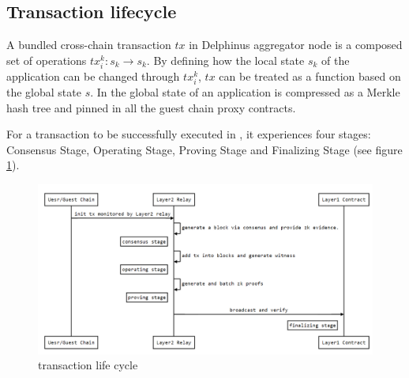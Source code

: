 \documentclass[pageno]{jpaper}
\begin{document}
\subsection{Transaction lifecycle}
A bundled cross-chain transaction $tx$ in Delphinus aggregator node is a composed set of operations $tx_i^k: s_k \rightarrow s_k$. By defining how the local state $s_k$ of the application can be changed through $tx_i^k$, $tx$ can be treated as a function based on the global state $s$. In \dprotocol the global state of an application is compressed as a Merkle hash tree and pinned in all the guest chain proxy contracts.

For a transaction to be successfully executed in \dprotocol, it experiences four stages: Consensus Stage, Operating Stage, Proving Stage and Finalizing Stage (see figure \ref{consensus-sequence}).
\begin{figure}[!ht]
\includegraphics[scale=0.4]{consensus-sequence.png}
\caption{transaction life cycle}
\label{consensus-sequence}
\end{figure}
\end{document}
